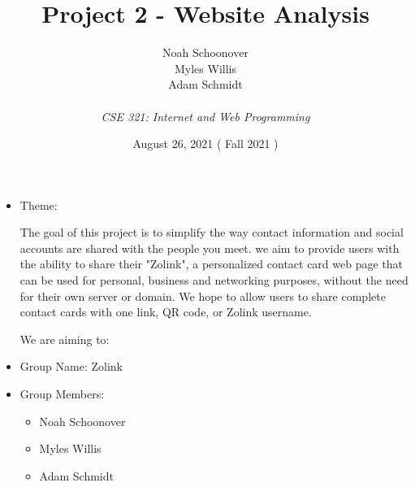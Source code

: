 \documentclass[12pt]{article}%
\def\assignmentName { Project 2 - Website Analysis                      }
\def\className      { CSE 321: Internet and Web Programming             }
\def\studentName    { Noah Schoonover \\ Myles Willis \\ Adam Schmidt   }
\def\studentEmail   {  }
\def\dueDate        { August 26, 2021                                   }
\def\semesterDate   { Fall 2021                                         }
\begin{document}


\begin{singlespace}
\title{ \assignmentName }
\author{ \studentName \\ {\small \studentEmail} \\ {\it \className}}
\date{\dueDate (\semesterDate)}
\maketitle
\end{singlespace}



\begin{itemize}
    \item Theme: 
    
    The goal of this project is to simplify the way contact information and social accounts are shared with the people you meet. 
    we aim to provide users with the ability to share their "Zolink", a personalized contact card web page that can be used for personal, 
    business and networking purposes, without the need for their own server or domain. We hope to allow users to share complete 
    contact cards with one link, QR code, or Zolink username.
    
    We are aiming to:
    
    
    \item Group Name: Zolink
    \item Group Members:
    \begin{itemize}
    	\item Noah Schoonover
    	\item Myles Willis
    	\item Adam Schmidt
    \end{itemize}
\end{itemize}
\end{document}
